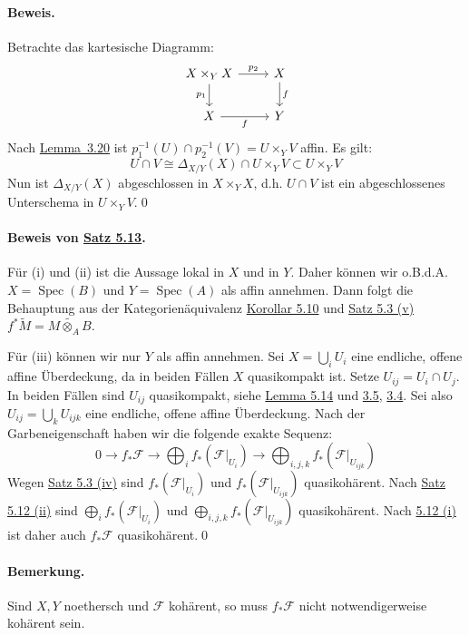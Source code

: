 \paragraph{Beweis.} Betrachte das kartesische Diagramm:
\[\begin{tikzcd}
X\times_Y X\ar[r, "p_2"]\ar[d, "p_1"'] & X\ar[d, "f"]\\
X\ar[r, "f"'] & Y
\end{tikzcd} \]
Nach \hyperref[3.20]{Lemma~3.20} ist $p_1^{-1}(U)\cap p_2^{-1}(V)=U\times_YV$ affin. Es gilt: \[U\cap V\cong \Delta_{X/Y}(X)\cap U\times_YV\subset U\times_YV\] Nun ist $\Delta_{X/Y}(X)$ abgeschlossen in $X\times_YX$, d.h. $U\cap V$ ist ein abgeschlossenes Un\-ter\-sche\-ma in $U\times_YV$.\qed

\paragraph{Beweis von \hyperref[5.13]{Satz 5.13}.} Für (i) und (ii) ist die Aussage lokal in $X$ und in $Y$. Daher können wir o.B.d.A. $X=\operatorname{Spec}(B)$ und $Y=\operatorname{Spec}(A)$ als affin annehmen. Dann folgt die Behauptung aus der Kategorienäquivalenz \hyperref[5.10]{Korollar 5.10} und \hyperref[5.3]{Satz 5.3 (v)} $f^\ast\widetilde{M} = \widetilde{M\otimes_AB}$.

Für (iii) können wir nur $Y$ als affin annehmen. Sei $X=\bigcup_i U_i$ eine endliche, offene affine Überdeckung, da in beiden Fällen $X$ quasikompakt ist. Setze $U_{ij}=U_i\cap U_j$. In beiden Fällen sind $U_{ij}$ quasikompakt, siehe \hyperref[5.14]{Lemma 5.14} und \hyperref[3.5]{3.5}, \hyperref[3.4]{3.4}. Sei also $U_{ij}=\bigcup_k U_{ijk}$ eine endliche, offene affine Überdeckung. Nach der Garbeneigenschaft haben wir die folgende exakte Sequenz:
\[0\to f_\ast\mathcal{F} \to\bigoplus_if_\ast(\mathcal{F}|_{U_i}) \to\bigoplus_{i,j,k}f_\ast(\mathcal{F}|_{U_{ijk}}) \]
Wegen \hyperref[5.3]{Satz 5.3 (iv)} sind $f_\ast(\mathcal{F}|_{U_i})$ und $f_\ast(\mathcal{F}|_{U_{ijk}})$ quasikohärent. Nach \hyperref[5.12]{Satz 5.12 (ii)} sind $\bigoplus_i f_\ast(\mathcal{F}|_{U_i})$ und $\bigoplus_{i,j,k}f_\ast(\mathcal{F}|_{U_{ijk}})$ quasikohärent. Nach \hyperref[5.12]{5.12 (i)} ist daher auch $f_\ast\mathcal{F}$ quasikohärent.\qed

\paragraph{Bemerkung.} Sind $X,Y$ noethersch und $\mathcal{F}$  kohärent, so muss $f_\ast\mathcal{F}$ nicht notwendigerweise kohärent sein.

